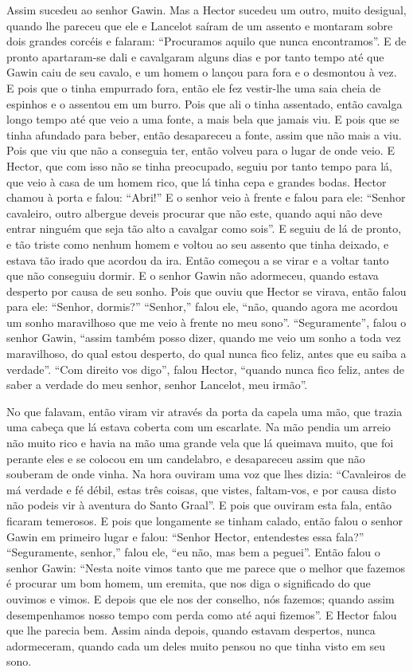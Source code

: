 Assim sucedeu ao senhor Gawin. Mas a Hector sucedeu um outro, muito desigual,
quando lhe pareceu que ele e Lancelot saíram de um assento e montaram sobre
dois grandes corcéis e falaram: “Procuramos aquilo que nunca encontramos”. E de
pronto apartaram-se dali e cavalgaram alguns dias e por tanto tempo até que
Gawin caiu de seu cavalo, e um homem o lançou para fora e o desmontou à
vez. E pois que o tinha empurrado fora, então ele fez vestir-lhe uma saia cheia
de espinhos e o assentou em um burro. Pois que ali o tinha assentado, então
cavalga longo tempo até que veio a uma fonte, a mais bela que jamais viu. E
pois que se tinha afundado para beber, então desapareceu a fonte, assim que não
mais a viu. Pois que viu que não a conseguia ter, então volveu para o lugar de
onde veio. E Hector, que com isso não se tinha preocupado, seguiu por tanto
tempo para lá, que veio à casa de um homem rico, que lá tinha cepa e grandes
bodas. Hector chamou à porta e falou: “Abri!” E o senhor veio à frente e falou
para ele: “Senhor cavaleiro, outro albergue deveis procurar que não este,
quando aqui não deve entrar ninguém que seja tão alto a cavalgar como sois”. E
seguiu de lá de pronto, e tão triste como nenhum homem e voltou ao seu assento
que tinha deixado, e estava tão irado que acordou da ira. Então
começou a se virar e a voltar tanto que não conseguiu dormir. E o senhor Gawin
não adormeceu, quando estava desperto por causa de seu sonho. Pois que ouviu
que Hector se virava, então falou para ele: “Senhor, dormis?” “Senhor,” falou
ele, “não, quando agora me acordou um sonho maravilhoso que me veio à frente no
meu sono”. “Seguramente”, falou o senhor Gawin, “assim também posso dizer,
quando me veio um sonho a toda vez maravilhoso, do qual estou desperto, do qual
nunca fico feliz, antes que eu saiba a verdade”. “Com direito vos digo”, falou
Hector, “quando nunca fico feliz, antes de saber a verdade do meu senhor,
senhor Lancelot, meu irmão”.

No que falavam, então viram vir através da porta da capela uma mão, que trazia
uma cabeça que lá estava coberta com um escarlate. Na mão pendia um arreio não
muito rico e havia na mão uma grande vela que lá queimava muito, que foi
perante eles e se colocou em um candelabro, e desapareceu assim que não
souberam de onde vinha. Na hora ouviram uma voz que lhes dizia: “Cavaleiros de
má verdade e fé débil, estas três coisas, que vistes, faltam-vos, e por causa
disto não podeis vir à aventura do Santo Graal”. E pois que ouviram
esta fala, então ficaram temerosos. E pois que longamente se tinham calado,
então falou o senhor Gawin em primeiro lugar e falou: “Senhor Hector,
entendestes essa fala?” “Seguramente, senhor,” falou ele, “eu não, mas bem a
peguei”. Então falou o senhor Gawin: “Nesta noite vimos tanto que me parece que
o melhor que fazemos é procurar um bom homem, um eremita, que nos diga o
significado do que ouvimos e vimos. E depois que ele nos der conselho, nós
fazemos; quando assim desempenhamos nosso tempo com perda como até aqui
fizemos”. E Hector falou que lhe parecia bem. Assim ainda depois, quando
estavam despertos, nunca adormeceram, quando cada um deles muito pensou no que
tinha visto em seu sono.

